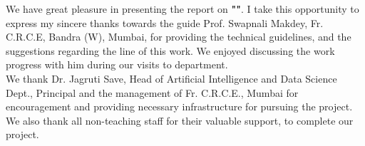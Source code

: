 \begin{acknowledgments}

\thispagestyle{empty}

\noindent We have great pleasure in presenting the report on {\bf "\projecttitle"}. I take this opportunity to express my sincere thanks towards the guide Prof. Swapnali Makdey, Fr. C.R.C.E, Bandra (W), Mumbai, for providing the technical guidelines, and the suggestions regarding the line of this work. We enjoyed discussing the work progress with him during our visits to department.\\

\noindent We thank Dr. Jagruti Save, Head of Artificial Intelligence and Data Science Dept., Principal and the management of Fr. C.R.C.E., Mumbai for encouragement and providing necessary infrastructure for pursuing the project.\\

\noindent We also thank all non-teaching staff for their valuable support, to complete our project.
\par
%


\end{acknowledgments}


